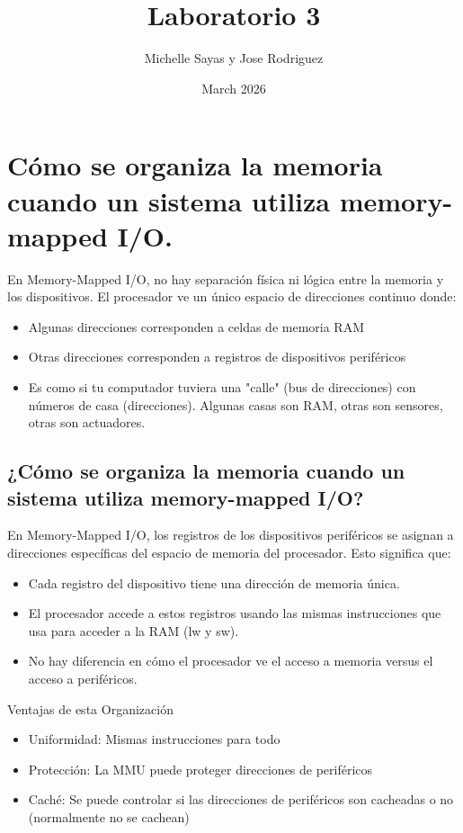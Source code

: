 \documentclass{article}
\title{Laboratorio 3}
\author{Michelle Sayas y Jose Rodriguez}
\date{March 2026}
\begin{document}
\maketitle

\section{Cómo se organiza la memoria cuando un sistema utiliza memory-mapped 
I/O.}
En Memory-Mapped I/O, no hay separación física ni lógica entre la memoria y los dispositivos. El procesador ve un único espacio de direcciones continuo donde:
\begin{itemize}
    \item Algunas direcciones corresponden a celdas de memoria RAM

    \item Otras direcciones corresponden a registros de dispositivos periféricos

    \item Es como si tu computador tuviera una "calle" (bus de direcciones) con números de casa (direcciones). Algunas casas son RAM, otras son sensores, otras son actuadores.
\end{itemize}

\subsection{¿Cómo se organiza la memoria cuando un sistema utiliza memory-mapped I/O?}

En Memory-Mapped I/O, los registros de los dispositivos periféricos se asignan a direcciones específicas del espacio de memoria del procesador. Esto significa que:

\begin{itemize}
    \item Cada registro del dispositivo tiene una dirección de memoria única.

    \item El procesador accede a estos registros usando las mismas instrucciones que usa para acceder a la RAM (lw y sw).

    \item No hay diferencia en cómo el procesador ve el acceso a memoria versus el acceso a periféricos.
\end{itemize}

Ventajas de esta Organización
\begin{itemize}
    \item Uniformidad: Mismas instrucciones para todo

    \item Protección: La MMU puede proteger direcciones de periféricos

    \item Caché: Se puede controlar si las direcciones de periféricos son cacheadas o no (normalmente no se cachean)
\end{itemize} 
\end{document}
